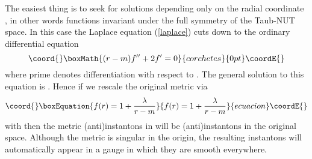 \documentclass[a4paper,12pt,draft]{article}
\begin{document}
The easiest thing is to seek for solutions depending only on the radial
coordinate \coordHE{}, in other words functions invariant under the full \coordHE{}
symmetry of the Taub-NUT space. In this case the Laplace equation
(\ref{laplace}) cuts down to the ordinary differential equation
\[\coord{}\boxMath{(r-m)f''+2f'=0}{corchetes}{0pt}\coordE{}\]
where prime denotes differentiation with respect to \coordHE{}. The general
solution to this equation is \coordHE{}. Hence if we rescale
the original metric via 
\begin{equation}\coord{}\boxEquation{
f(r)=1+{\lambda\over r-m}
\label{skala}
}{
f(r)=1+{\lambda\over r-m}
}{ecuacion}\coordE{}\end{equation}
with \coordHE{} then the metric (anti)instantons in \coordHE{}
will be (anti)instantons in the original space. Although the metric
\coordHE{} is singular in the origin, the resulting instantons will 
automatically appear in a gauge in which they are smooth everywhere.
\end{document}
